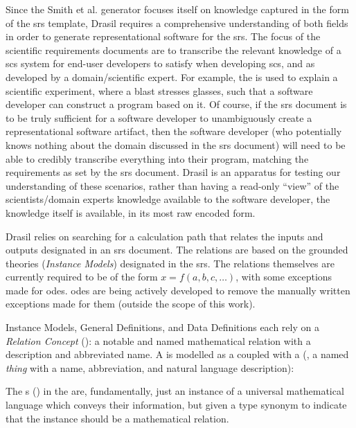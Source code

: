 Since the Smith et al. generator focuses itself on knowledge captured in the
form of the \acs{srs} template, Drasil requires a comprehensive understanding of
both fields in order to generate representational software for the \acs{srs}.
The focus of the scientific requirements documents are to transcribe the
relevant knowledge of a \acs{scs} system for end-user developers to satisfy when
developing \acs{scs}, and as developed by a domain/scientific expert. For
example, the 
is used to explain a scientific experiment, where a blast stresses glasses, such
that a software developer can construct a program based on it. Of course, if the
\acs{srs} document is to be truly sufficient for a software developer to
unambiguously create a representational software artifact, then the software
developer (who potentially knows nothing about the domain discussed in the
\acs{srs} document) will need to be able to credibly transcribe everything into
their program, matching the requirements as set by the \acs{srs} document.
Drasil is an apparatus for testing our understanding of these scenarios, rather
than having a read-only ``view'' of the scientists/domain experts knowledge
available to the software developer, the knowledge itself is available, in its
most raw encoded form.

Drasil relies on searching for a calculation path that relates the inputs and
outputs designated in an \acs{srs} document. The relations are based on the
grounded theories (\textit{Instance Models}) designated in the \acs{srs}. The
relations themselves are currently required to be of the form \(x = f(a, b, c,
\ldots{})\), with some exceptions made for \acsp{ode}. \acsp{ode} are being
actively developed to remove the manually written exceptions made for them
(outside the scope of this work).

Instance Models, General Definitions, and Data Definitions each rely on a
\textit{Relation Concept} (\RelationConcept{}): a notable and named mathematical
relation with a description and abbreviated name. A \RelationConcept{} is
modelled as a \Relation{} coupled with a \ConceptChunk{}
(, a named \textit{thing} with a name,
abbreviation, and natural language description):

\originalRelationConcept{}

The \Relation{}s () in the \RelationConcept{} are,
fundamentally, just an instance of a universal mathematical language which
conveys their information, but given a type synonym to indicate that the
instance should be a mathematical relation.

